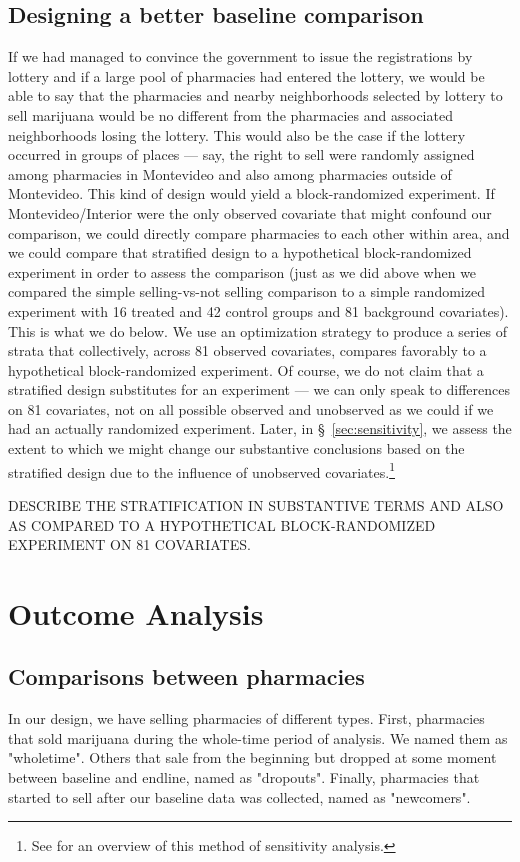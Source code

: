 \documentclass[11pt]{article}
\begin{document}
\subsection{Designing a better baseline comparison}

If we had managed to convince the government to issue the registrations by lottery and if a large pool of pharmacies had entered the lottery, we would be able to say that the pharmacies and nearby neighborhoods selected by lottery to sell marijuana would be no different from the pharmacies and associated neighborhoods losing the lottery. This would also be the case if the lottery occurred in groups of places --- say, the right to sell were randomly assigned among pharmacies in Montevideo and also among pharmacies outside of Montevideo. This kind of design would yield a block-randomized experiment. If Montevideo/Interior were the only observed covariate that might confound our comparison, we could directly compare pharmacies to each other within area, and we could compare that stratified design to a hypothetical block-randomized experiment in order to assess the comparison (just as we did above when we compared the simple selling-vs-not selling comparison to a simple randomized experiment with 16 treated and 42 control groups and 81 background covariates). This is what we do below. We use an optimization strategy to produce a series of strata that collectively, across 81 observed covariates, compares favorably to a hypothetical block-randomized experiment. Of course, we do not claim that a stratified design substitutes for an experiment --- we can only speak to differences on 81 covariates, not on all possible observed and unobserved as we could if we had an actually randomized experiment. Later, in \S~\ref{sec:sensitivity}, we assess the extent to which we might change our substantive conclusions based on the stratified design due to the influence of unobserved covariates.\footnote{See \citep[Chapter 3]{rosenbaum2010design} for an overview of this method of sensitivity analysis.}


DESCRIBE THE STRATIFICATION IN SUBSTANTIVE TERMS AND ALSO AS COMPARED TO A HYPOTHETICAL BLOCK-RANDOMIZED EXPERIMENT ON 81 COVARIATES.


\section{Outcome Analysis}
\subsection{Comparisons between pharmacies}
In our design, we have selling pharmacies of different types. First, pharmacies that sold marijuana during the whole-time period of analysis. We named them as "wholetime". Others that sale from the beginning but dropped at some moment between baseline and endline, named as "dropouts". Finally, pharmacies that started to sell after our baseline data was collected, named as "newcomers". 
\end{document}
